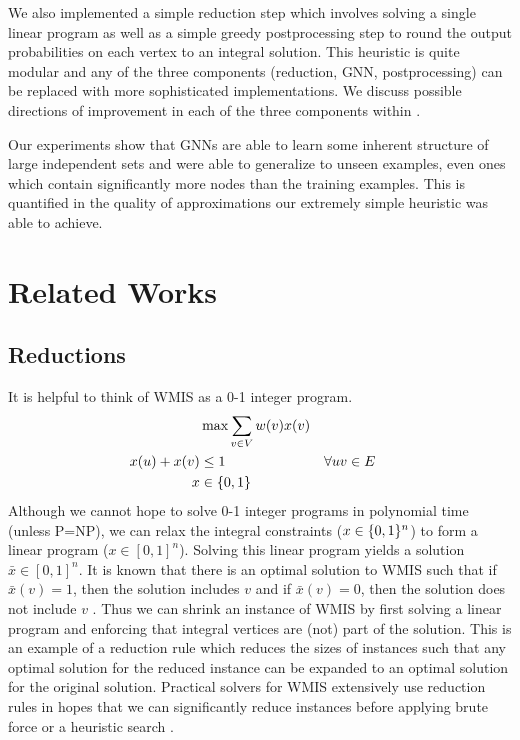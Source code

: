 \documentclass{article}
\DeclarePairedDelimiter{\set}{\lbrace}{\rbrace}
\begin{document}
We also implemented a simple reduction step which involves solving a single linear program
as well as a simple greedy postprocessing step to round the output probabilities on each vertex to an integral solution.
This heuristic is quite modular and any of the three components
(reduction, GNN, postprocessing)
can be replaced with more sophisticated implementations.
We discuss possible directions of improvement in each of the three components
within .

Our experiments show that GNNs are able to learn some inherent structure of large independent sets
and were able to generalize to unseen examples,
even ones which contain significantly more nodes than the training examples.
This is quantified in the quality of approximations our extremely simple heuristic was able to achieve.

\section{Related Works}
\subsection{Reductions}
It is helpful to think of WMIS as a 0-1 integer program.
\begin{align*}
  &\max \sum_{v\in V} w(v) x(v) \\
  x(u) + x(v) &\leq 1 &&\forall uv\in E \\
  x &\in \set{0, 1}
\end{align*}
Although we cannot hope to solve 0-1 integer programs in polynomial time
(unless P=NP),
we can relax the integral constraints ($x\in \set{0, 1}^n$)
to form a linear program ($x\in [0, 1]^n$).
Solving this linear program yields a solution $\bar x\in [0, 1]^n$.
It is known that there is an optimal solution to WMIS
such that if $\bar x(v) = 1$,
then the solution includes $v$
and if $\bar x(v) = 0$,
then the solution does not include $v$ \citet{lpreduction}.
Thus we can shrink an instance of WMIS by first solving a linear program
and enforcing that integral vertices are (not) part of the solution.
This is an example of a reduction rule which reduces the sizes of instances
such that any optimal solution for the reduced instance can be expanded to an optimal solution
for the original solution.
Practical solvers for WMIS extensively use reduction rules
in hopes that we can significantly reduce instances
before applying brute force or a heuristic search \cite{kamis}.
\end{document}
